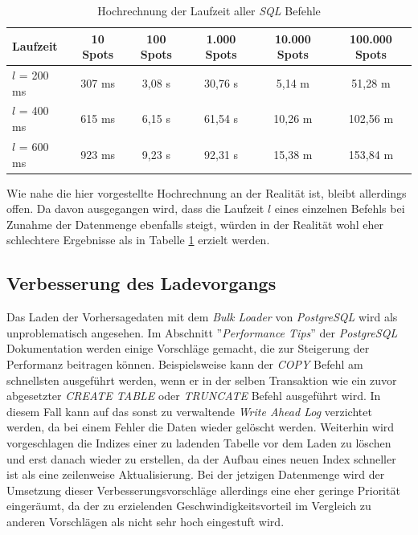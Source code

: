 \begin{table}[h]
  \centering
  {\sf
    \footnotesize
    \begin{longtable}{l|c|c|c|c|c}

      \toprule
      \textbf{Laufzeit} & \textbf{10 Spots} & \textbf{100 Spots} & \textbf{1.000 Spots} & \textbf{10.000 Spots} & \textbf{100.000 Spots} \\
      \midrule
      $l$ = 200 ms & 307 ms & 3,08 s & 30,76 s &  5,14 m &  51,28 m \\
      $l$ = 400 ms & 615 ms & 6,15 s & 61,54 s & 10,26 m & 102,56 m \\
      $l$ = 600 ms & 923 ms & 9,23 s & 92,31 s & 15,38 m & 153,84 m \\
      \bottomrule

    \end{longtable}
  }

  \caption{Hochrechnung der Laufzeit aller \textit{SQL} Befehle}
  \label{tab:sql_laufzeit}

\end{table}

Wie nahe die hier vorgestellte Hochrechnung an der Realität ist,
bleibt allerdings offen. Da davon ausgegangen wird, dass die Laufzeit
$l$ eines einzelnen Befehls bei Zunahme der Datenmenge ebenfalls
steigt, würden in der Realität wohl eher schlechtere Ergebnisse als in
Tabelle \ref{tab:sql_laufzeit} erzielt werden.

\subsection{Verbesserung des Ladevorgangs}
Das Laden der Vorhersagedaten mit dem \textit{Bulk Loader} von
\textit{PostgreSQL} wird als unproblematisch angesehen. Im Abschnitt
''\textit{Performance Tips}'' \cite{postgresql:performance} der
\textit{PostgreSQL} Dokumentation werden einige Vorschläge gemacht,
die zur Steigerung der Performanz beitragen können. Beispielsweise
kann der \textit{COPY} Befehl am schnellsten ausgeführt werden, wenn
er in der selben Transaktion wie ein zuvor abgesetzter \textit{CREATE
  TABLE} oder \textit{TRUNCATE} Befehl ausgeführt wird. In diesem Fall
kann auf das sonst zu verwaltende \textit{Write Ahead Log} verzichtet
werden, da bei einem Fehler die Daten wieder gelöscht
werden. Weiterhin wird vorgeschlagen die Indizes einer zu ladenden
Tabelle vor dem Laden zu löschen und erst danach wieder zu erstellen,
da der Aufbau eines neuen Index schneller ist als eine zeilenweise
Aktualisierung. Bei der jetzigen Datenmenge wird der Umsetzung dieser
Verbesserungsvorschläge allerdings eine eher geringe Priorität
eingeräumt, da der zu erzielenden Geschwindigkeitsvorteil im Vergleich
zu anderen Vorschlägen als nicht sehr hoch eingestuft wird.

